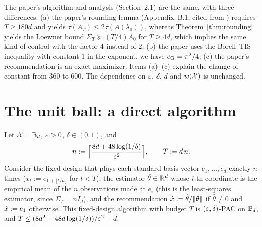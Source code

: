 \begin{remark}
The paper's algorithm and analysis (Section~2.1) are the same, with three differences: (a) the
paper's rounding lemma (Appendix~B.1, cited from \cite{katz2020empirical,allen2021near})
requires $T \ge 180d$ and yields $\tau(A_T) \le 2\tau(A(\lambda_0))$, whereas
Theorem~\ref{thm:rounding} yields the Loewner bound $\Sigma_T \succeq (T/4)A_0$ for $T \ge 4d$,
which implies the same kind of control with the factor $4$ instead of $2$; (b) the paper uses
the Borell--TIS inequality with constant $1$ in the exponent, we have $c_{\mathrm{G}} = \pi^2/4$; (c) the
paper's recommendation is an exact maximizer. Items (a)--(c) explain the change of constant from
$360$ to $600$. The dependence on $\varepsilon$, $\delta$, $d$ and $w(\mathcal{X})$ is unchanged.
\end{remark}

\section{The unit ball: a direct algorithm}
\label{sec:upper_ball}

\begin{lemma}\label{lem:ball_identification}
Let $\mathcal{X} = \mathbb{B}_d$, $\varepsilon > 0$, $\delta \in (0,1)$, and
\[
  n := \Big\lceil \frac{8d + 48\log(1/\delta)}{\varepsilon^2}\Big\rceil, \qquad T := d\,n .
\]
Consider the fixed design that plays each standard basis vector $e_1,\dots,e_d$ exactly $n$
times ($x_t := e_{1 + \lfloor t/n\rfloor}$ for $t < T$), the estimator $\hat\theta \in \mathbb{R}^d$ whose
$i$-th coordinate is the empirical mean of the $n$ observations made at $e_i$ (this is the
least-squares estimator, since $\Sigma_T = nI_d$), and the recommendation
$\hat{x} := \hat\theta/\lVert \hat\theta \rVert$ if $\hat\theta \ne 0$ and $\hat{x} := e_1$ otherwise. This
fixed-design algorithm with budget $T$ is $(\varepsilon,\delta)$-PAC on $\mathbb{B}_d$, and
$T \le (8d^2 + 48d\log(1/\delta))/\varepsilon^2 + d$.
\end{lemma}


